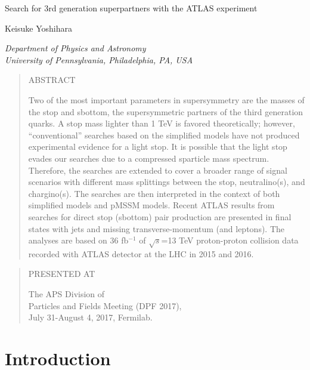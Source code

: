 \documentclass[UKenglish,10pt]{article}
\def\Title#1{\begin{center} {\Large #1 } \end{center}}
\def\Author#1{\begin{center}{ \sc #1} \end{center}}
\def\Address#1{\begin{center}{ \it #1} \end{center}}
\newcommand\pubblock{\rightline{\begin{tabular}{l} Proceedings of the DPF 2017\\\\
         \pubdate  \end{tabular}}}
\newenvironment{Abstract}{\begin{quotation} \begin{center} 
             \large ABSTRACT \end{center}\bigskip 
      \begin{center}\begin{large}}{\end{large}\end{center} \end{quotation}}
\newenvironment{Presented}{\begin{quotation} \begin{center} 
             PRESENTED AT\end{center}\bigskip 
      \begin{center}\begin{large}}{\end{large}\end{center} \end{quotation}}
\newcommand\pubdate{\today}
\def\affiliation{
Department of Physics and Astronomy \\
University of Pennsylvania, Philadelphia, PA, USA}
\def\support{\footnote{Work supported by  XYZ Foundation }}
\begin{document}
\large
\begin{titlepage}
\pubblock


\vfill
\Title{ Search for 3rd generation superpartners with the ATLAS experiment }

\vfill

\Author{ Keisuke Yoshihara }
\Address{\affiliation}
\vfill
\begin{Abstract}
Two of the most important parameters in supersymmetry are the masses of the stop and sbottom, the supersymmetric partners of the third generation quarks. A stop mass lighter than 1 TeV is favored theoretically; however, ``conventional'' searches based on the simplified models have not produced experimental evidence for a light stop. It is possible that the light stop evades our searches due to a compressed sparticle mass spectrum. Therefore, the searches are extended to cover a broader range of signal scenarios with different mass splittings between the stop, neutralino(s), and chargino(s). The searches are then interpreted in the context of both simplified models and pMSSM models. Recent ATLAS results from searches for direct stop (sbottom) pair production are presented in final states with jets and missing transverse-momentum (and leptons). The analyses are based on 36 fb$^{-1}$ of $\sqrt{s}$=13 TeV proton-proton collision data recorded with ATLAS detector at the LHC in 2015 and 2016.
\end{Abstract}
\vfill

\begin{Presented}
The APS Division of\\ 
Particles and Fields Meeting (DPF 2017),\\ 
July 31-August 4, 2017, Fermilab.\\
\end{Presented}
\vfill
\end{titlepage}
\def\thefootnote{\fnsymbol{footnote}}
\setcounter{footnote}{0}
%

\normalsize 


\section{Introduction}
\end{document}

